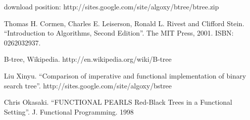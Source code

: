 \documentclass{article}
\begin{document}
download position: http://sites.google.com/site/algoxy/btree/btree.zip

\begin{thebibliography}{99}

Thomas H. Cormen, Charles E. Leiserson, Ronald L. Rivest and Clifford Stein. ``Introduction to Algorithms, Second Edition''. The MIT Press, 2001. ISBN: 0262032937.

B-tree, Wikipedia. http://en.wikipedia.org/wiki/B-tree

Liu Xinyu. ``Comparison of imperative and functional implementation of
binary search tree''. http://sites.google.com/site/algoxy/bstree

Chris Okasaki. ``FUNCTIONAL PEARLS Red-Black Trees in a Functional Setting''. J. Functional Programming. 1998

\end{thebibliography}

\ifx\wholebook\relax \else
\end{document}
